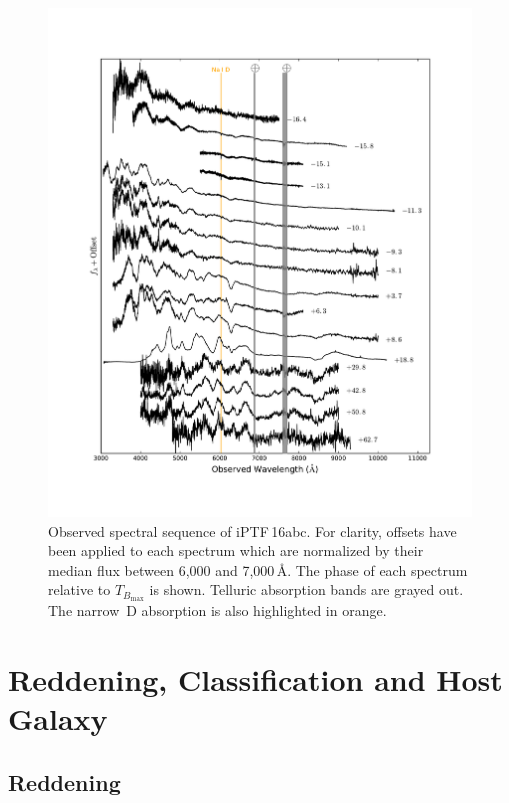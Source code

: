 \documentclass[twocolumn]{aastex61}
\newcommand{\abc}{iPTF\,16abc}
\begin{document}
\begin{figure}[!htb]
  \centering
  \includegraphics[width=1.0\textwidth]{spectra.pdf}
  \caption{Observed spectral sequence of \abc. For clarity, offsets 
  have been applied to each 
  spectrum which are normalized by their median flux between 
  6,000 and 7,000$\,\textrm{\AA}$. The phase of each spectrum 
  relative to $T_{B_\mathrm{max}}$ is shown. Telluric absorption
  bands are grayed out. The narrow \,D absorption is also
  highlighted in orange.}
  \label{fig:spec_seq}
\end{figure}


\section{Reddening, Classification and Host Galaxy}
\label{sec:usual_staff}

\subsection{Reddening}
\label{sec:reddening}
\end{document}
